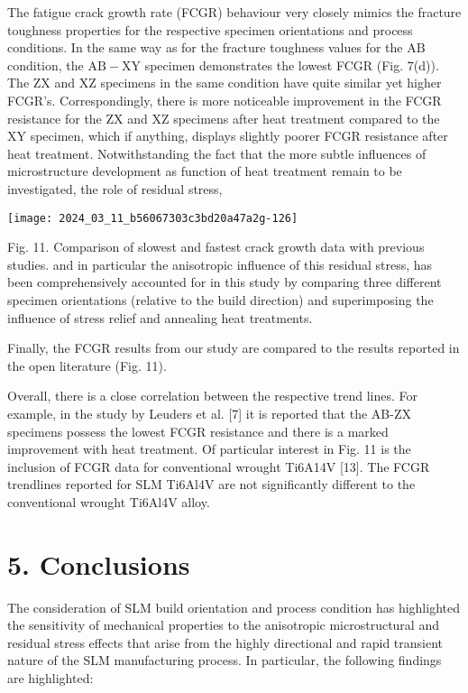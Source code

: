 \documentclass[10pt]{article}
\begin{document}
The fatigue crack growth rate (FCGR) behaviour very closely mimics the fracture toughness properties for the respective specimen orientations and process conditions. In the same way as for the fracture toughness values for the $\mathrm{AB}$ condition, the $\mathrm{AB}-\mathrm{XY}$ specimen demonstrates the lowest FCGR (Fig. 7(d)). The ZX and XZ specimens in the same condition have quite similar yet higher FCGR's. Correspondingly, there is more noticeable improvement in the FCGR resistance for the ZX and XZ specimens after heat treatment compared to the XY specimen, which if anything, displays slightly poorer FCGR resistance after heat treatment. Notwithstanding the fact that the more subtle influences of microstructure development as function of heat treatment remain to be investigated, the role of residual stress,

\begin{center}
\texttt{[image: 2024\_03\_11\_b56067303c3bd20a47a2g-126]}
\end{center}

Fig. 11. Comparison of slowest and fastest crack growth data with previous studies. and in particular the anisotropic influence of this residual stress, has been comprehensively accounted for in this study by comparing three different specimen orientations (relative to the build direction) and superimposing the influence of stress relief and annealing heat treatments.

Finally, the FCGR results from our study are compared to the results reported in the open literature (Fig. 11).

Overall, there is a close correlation between the respective trend lines. For example, in the study by Leuders et al. [7] it is reported that the AB-ZX specimens possess the lowest FCGR resistance and there is a marked improvement with heat treatment. Of particular interest in Fig. 11 is the inclusion of FCGR data for conventional wrought Ti6A14V [13]. The FCGR trendlines reported for SLM Ti6Al4V are not significantly different to the conventional wrought Ti6Al4V alloy.

\section*{5. Conclusions}
The consideration of SLM build orientation and process condition has highlighted the sensitivity of mechanical properties to the anisotropic microstructural and residual stress effects that arise from the highly directional and rapid transient nature of the SLM manufacturing process. In particular, the following findings are highlighted:
\end{document}
